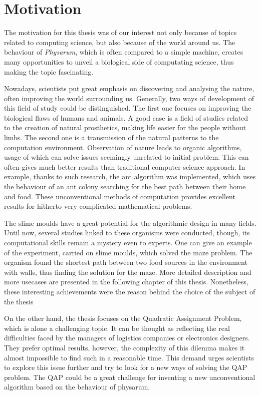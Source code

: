 \section{Motivation}
\label{section:introduction_motivation}

The motivation for this thesis was of our interest not only because of topics related to computing science, but also because of the world around us. The behaviour of \textit{Physarum}, which is often compared to a simple machine, creates many opportunities to unveil a biological side of computating science, thus making the topic fascinating.

Nowadays, scientists put great emphasis on discovering and analysing the nature, often improving the world surrounding us. Generally, two ways of development of this field of study could be distinguished. The first one focuses on improving the biological flaws of humans and animals. A good case is a field of studies related to the creation of natural prosthetics, making life easier for the people without limbs. The second one is a transmission of the natural patterns to the computation environment. Observation of nature leads to organic algorithms, usage of which can solve issues seemingly unrelated to initial problem. This can often gives much better results than traditional computer science approach. In example, thanks to such research, the ant algorithm was implemented, which uses the behaviour of an ant colony searching for the best path between their home and food. These unconventional methods of computation provides excellent results for hitherto very complicated mathematical problems.

The slime moulds have a great potential for the algorithmic design in many fields. Until now, several studies linked to these organisms were conducted, though, its computational skills remain a mystery even to experts. One can give an example of the experiment, carried on slime moulds, which solved the maze problem. The organism found the shortest path between two food sources in the environment with walls, thus finding the solution for the maze. More detailed description and more usecases are presented in the following chapter of this thesis. Nonetheless, these interesting achievements were the reason behind the choice of the subject of the thesis

On the other hand, the thesis focuses on the Quadratic Assignment Problem, which is alone a challenging topic. It can be thought as reflecting the real difficulties faced by the managers of logistics companies or electronics designers. They prefer optimal results, however, the complexity of this dilemma makes it almost impossible to find such in a reasonable time. This demand urges scientists to explore this issue further and try to look for a new ways of solving the QAP problem.
The QAP could be a great challenge for inventing a new unconventional algorithm based on the behaviour of physarum.

